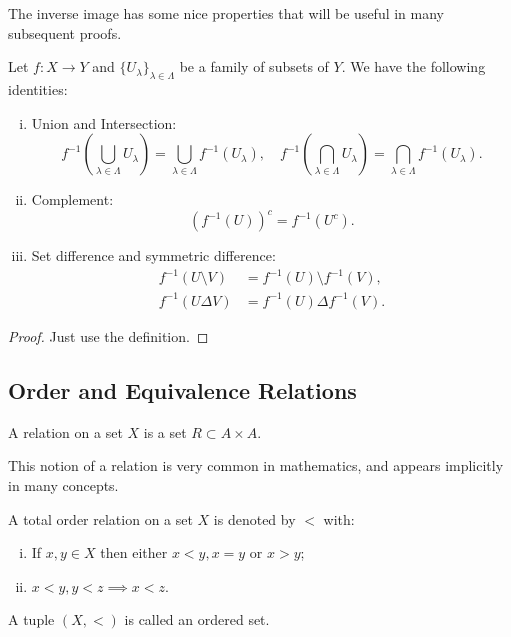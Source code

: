 The inverse image has some nice properties that will be useful in many subsequent proofs.
\begin{proposition}
  Let $f: X \to Y$ and $\{U_\lambda\}_{\lambda \in \Lambda}$ be a family of subsets of $Y$.
  We have the following identities:
  \begin{enumerate}[(i)]
    \item Union and Intersection:
      \begin{displaymath}
        f^{-1}\left(\bigcup_{\lambda \in \Lambda} U_\lambda\right) =
        \bigcup_{\lambda \in \Lambda} f^{-1}(U_\lambda), \quad
        f^{-1}\left(\bigcap_{\lambda \in \Lambda} U_\lambda\right) =
        \bigcap_{\lambda \in \Lambda} f^{-1}(U_\lambda).
      \end{displaymath}
    \item Complement:
      \begin{displaymath}
        (f^{-1}(U))^c =
        f^{-1}(U^c).
      \end{displaymath}
    \item Set difference and symmetric difference:
      \begin{align*}
        f^{-1}(U \setminus V) &=
        f^{-1}(U) \setminus f^{-1}(V), \\
        f^{-1}(U \Delta V) &=
        f^{-1}(U) \Delta f^{-1}(V).
      \end{align*}
  \end{enumerate}
\end{proposition}
\begin{proof}
  Just use the definition.
\end{proof}

\subsection{Order and Equivalence Relations}

\begin{definition}[Relation]
  A relation on a set $X$ is a set $R \subset A \times A$.
\end{definition}

This notion of a relation is very common in mathematics, and appears
implicitly in many concepts.

\begin{definition}
	A total order relation on a set $X$ is denoted by $<$ with:
	\begin{enumerate}[(i)]
		\item If $x,y  \in X$ then either $x<y, x=y$ or $x>y$;
		\item $x < y, y < z \implies x < z$.
	\end{enumerate}
	A tuple $(X, <)$ is called an ordered set.
\end{definition}

